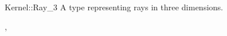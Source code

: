 \begin{ccRefConcept}{Kernel::Ray_3}
A type representing rays in three dimensions.

\ccRefines
{},

\ccSeeAlso
{}

\end{ccRefConcept}
